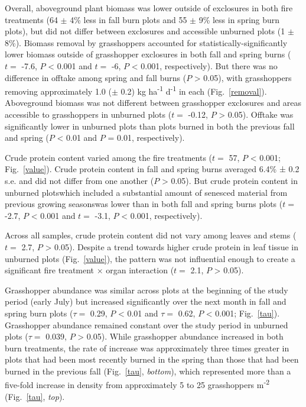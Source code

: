 \documentclass[referee, 
	            sn-basic]
           {sn-jnl}
\begin{document}
\begin{linenumbers}
Overall, aboveground plant biomass was lower outside of exclosures in both fire treatments (64 $\pm$ 4\% less in fall burn plots and 55 $\pm$ 9\% less in spring burn plots), but did not differ between exclosures and accessible unburned plots (1 $\pm$ 8\%).
Biomass removal by grasshoppers accounted for statistically-significantly lower biomass outside of grasshopper exclosures in both fall and spring burns (\(t =\) -7.6,
\(P\) \textless{} 0.001 and \(t =\) -6, \(P\) \textless{} 0.001, respectively).
But there was no difference in offtake among spring and fall burns (\(P\) \textgreater{} 0.05), with grasshoppers removing approximately 1.0 ($\pm$ 0.2) kg ha\textsuperscript{-1} d\textsuperscript{-1} in each (Fig.~\ref{removal}). 
Aboveground biomass was not different between grasshopper exclosures and areas accessible to grasshoppers in unburned plots (\(t =\) -0.12, \(P\) \textgreater{} 0.05).
 Offtake was significantly lower in unburned plots than plots burned in both the previous fall and spring (\(P\) \textless{} 0.01 and \(P\) = 0.01, respectively).

Crude protein content varied among the fire treatments (\(t =\) 57, \(P\) \textless{} 0.001; Fig.~\ref{value}). 
Crude protein content in fall and spring burns averaged 6.4\% ± 0.2 s.e. and did not differ from one another (\(P\) \textgreater{} 0.05). 
But crude protein content in unburned  plots\textemdash which included a substantial amount of senesced material from previous growing seasons\textemdash was lower than in both fall and spring burns plots (\(t =\) -2.7, \(P\) \textless{} 0.001 and \(t =\) -3.1, \(P\) \textless{} 0.001, respectively).

Across all samples, crude protein content did not vary among leaves and
stems (\(t =\) 2.7, \(P\) \textgreater{} 0.05). Despite a trend towards
higher crude protein in leaf tissue in unburned plots (Fig.~\ref{value}), the
pattern was not influential enough to create a significant fire
treatment \(\times\) organ interaction (\(t =\) 2.1, \(P\)
\textgreater{} 0.05).

Grasshopper abundance was similar across plots at the beginning of the study period (early July) but increased significantly over the next month in fall and spring burn plots (\(\tau =\) 0.29, \(P\) \textless{} 0.01 and \(\tau =\) 0.62, \(P\) \textless{} 0.001; Fig.~\ref{tau}). 
Grasshopper abundance remained constant over the study period in unburned plots (\(\tau =\) 0.039, \(P\) \textgreater{} 0.05). 
While grasshopper abundance increased in both burn treatments, the rate of increase was approximately three times greater in plots that had been most recently burned in the spring than those that had been burned in the previous fall (Fig.~\ref{tau}, \emph{bottom}), which represented more than a five-fold increase in density from approximately 5 to 25 grasshoppers m\textsuperscript{-2} (Fig.~\ref{tau}, \emph{top}).


\end{linenumbers}
\end{document}
